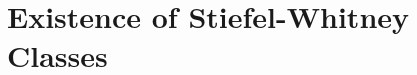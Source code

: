 \documentclass[../main]{subfiles}
\begin{document}
\chapter{Existence of Stiefel-Whitney Classes}\label{ch:8}



\end{document}
